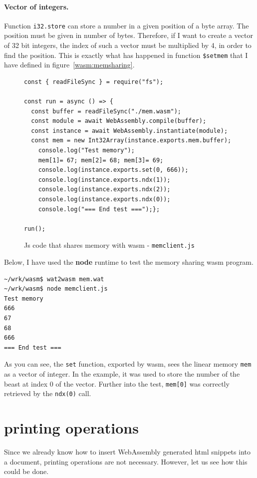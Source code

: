 \documentclass[a4paper,12pt]{book}
\begin{document}
\paragraph{Vector of integers.} Function \verb|i32.store|
can store a number in a
given position of a byte array. The position must
be given in number of bytes. Therefore, if I want
to create a vector of 32 bit integers, the index
of such a vector must be multiplied by 4, in order
to find the position. This is exactly what has happened
in function \verb|$setmem| that I have defined
in figure~\ref{wasm:memsharing}.

\begin{figure}[h!]
\begin{verbatim}
const { readFileSync } = require("fs");

const run = async () => {
  const buffer = readFileSync("./mem.wasm");
  const module = await WebAssembly.compile(buffer);
  const instance = await WebAssembly.instantiate(module);
  const mem = new Int32Array(instance.exports.mem.buffer);
    console.log("Test memory");
    mem[1]= 67; mem[2]= 68; mem[3]= 69;
    console.log(instance.exports.set(0, 666));
    console.log(instance.exports.ndx(1));
    console.log(instance.exports.ndx(2));
    console.log(instance.exports.ndx(0));
    console.log("=== End test ===");};

run();
\end{verbatim}
  \caption{Js code that shares memory
              with wasm - {\tt memclient.js}}
\end{figure}

Below, I have used the {\bf node} runtime to test the
memory sharing wasm program.

\begin{verbatim}
~/wrk/wasm$ wat2wasm mem.wat
~/wrk/wasm$ node memclient.js
Test memory
666
67
68
666
=== End test ===
\end{verbatim}

As you can see, the \verb|set| function, exported
by wasm, sees the linear memory \verb|mem| as
a vector of integer. In the example, it was used
to store the number of the beast at index 0 of
the vector. Further into the test, \verb|mem[0]|
was correctly retrieved by the \verb|ndx(0)| call.


\section{printing operations}

Since we already know how to insert WebAssembly
generated html snippets into a document, printing
operations are not necessary. However, let us see
how this could be done.
\end{document}
